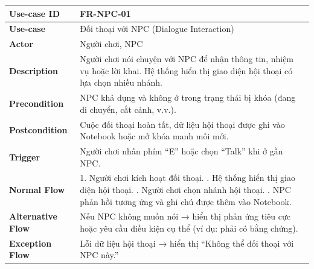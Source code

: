 \begin{table}[H]
\centering
\begin{tabular}{|p{4cm}|p{10cm}|}
\hline
\textbf{Use-case ID} & FR-NPC-01 \\ \hline
\textbf{Use-case} & Đối thoại với NPC (Dialogue Interaction) \\ \hline
\textbf{Actor} & Người chơi, NPC \\ \hline
\textbf{Description} & Người chơi nói chuyện với NPC để nhận thông tin, nhiệm vụ hoặc lời khai. Hệ thống hiển thị giao diện hội thoại có lựa chọn nhiều nhánh. \\ \hline
\textbf{Precondition} & NPC khả dụng và không ở trong trạng thái bị khóa (đang di chuyển, cắt cảnh, v.v.). \\ \hline
\textbf{Postcondition} & Cuộc đối thoại hoàn tất, dữ liệu hội thoại được ghi vào Notebook hoặc mở khóa manh mối mới. \\ \hline
\textbf{Trigger} & Người chơi nhấn phím “E” hoặc chọn “Talk” khi ở gần NPC. \\ \hline
\textbf{Normal Flow} &
1. Người chơi kích hoạt đối thoại. \newline
2. Hệ thống hiển thị giao diện hội thoại. \newline
3. Người chơi chọn nhánh hội thoại. \newline
4. NPC phản hồi tương ứng và ghi chú được thêm vào Notebook. \\ \hline
\textbf{Alternative Flow} &
Nếu NPC không muốn nói → hiển thị phản ứng tiêu cực hoặc yêu cầu điều kiện cụ thể (ví dụ: phải có bằng chứng). \\ \hline
\textbf{Exception Flow} &
Lỗi dữ liệu hội thoại → hiển thị “Không thể đối thoại với NPC này.” \\ \hline
\end{tabular}
\end{table}

